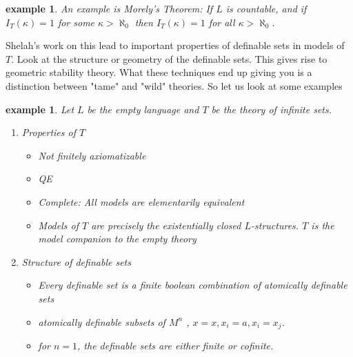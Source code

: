 \documentclass[letterpaper, 12pt]{article}
\newcommand{\fin}{\qquad \quad \hfill \framebox[1.75mm][l]{\,}}
\theoremstyle{stdthm}
\theoremstyle{stddef}
\newtheorem{eg}[thm]{example} %
\theoremstyle{stdnonum}
\theoremstyle{stdqands}
\theoremstyle{stdbold}
\begin{document}
\begin{eg}
An example is Morely's Theorem: If $L$ is countable, and if $I_T(\kappa) = 1$ for some $\kappa > \aleph_0$ then $I_T(\kappa) = 1$ for all $\kappa > \aleph_0$. 
\end{eg}

Shelah's work on this lead to important properties of definable sets in models of $T$. Look at the structure or geometry of the definable sets. This gives rise to geometric stability theory. What these techniques end up giving you is a distinction between "tame" and "wild" theories. So let us look at some examples\\



\begin{eg}
Let $L$ be the empty language and $T$ be the theory of infinite sets. 
\begin{enumerate}
\item Properties of $T$
\begin{itemize}
\item Not finitely axiomatizable
\item QE
\item Complete: All models are elementarily equivalent
\item Models of $T$ are precisely the existentially closed $L$-structures. $T$ is the model companion to the empty theory
\end{itemize}
\item Structure of definable sets
\begin{itemize}
\item Every definable set is a finite boolean combination of atomically definable sets
\item atomically definable subsets of $M^n$ , $x=x, x_i = a, x_i = x_j$. 
\item for $n = 1$, the definable sets are either finite or cofinite. 

\end{itemize}

\end{enumerate}


\end{eg}


\end{document}

